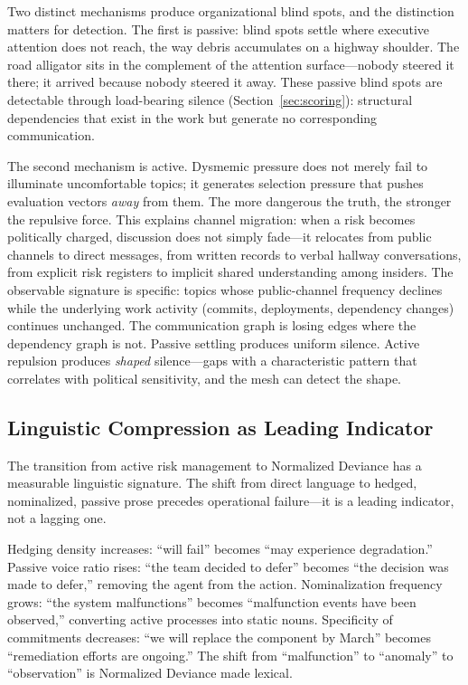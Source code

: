 \documentclass[11pt,a4paper]{article}
\begin{document}
Two distinct mechanisms produce organizational blind spots, and the distinction matters for detection. The first is passive: blind spots settle where executive attention does not reach, the way debris accumulates on a highway shoulder. The road alligator sits in the complement of the attention surface---nobody steered it there; it arrived because nobody steered it away. These passive blind spots are detectable through load-bearing silence (Section~\ref{sec:scoring}): structural dependencies that exist in the work but generate no corresponding communication.

The second mechanism is active. Dysmemic pressure does not merely fail to illuminate uncomfortable topics; it generates selection pressure that pushes evaluation vectors \emph{away} from them. The more dangerous the truth, the stronger the repulsive force. This explains channel migration: when a risk becomes politically charged, discussion does not simply fade---it relocates from public channels to direct messages, from written records to verbal hallway conversations, from explicit risk registers to implicit shared understanding among insiders. The observable signature is specific: topics whose public-channel frequency declines while the underlying work activity (commits, deployments, dependency changes) continues unchanged. The communication graph is losing edges where the dependency graph is not. Passive settling produces uniform silence. Active repulsion produces \emph{shaped} silence---gaps with a characteristic pattern that correlates with political sensitivity, and the mesh can detect the shape.


\subsection{Linguistic Compression as Leading Indicator}
\label{sec:linguistic}

The transition from active risk management to Normalized Deviance has a measurable linguistic signature. The shift from direct language to hedged, nominalized, passive prose precedes operational failure---it is a leading indicator, not a lagging one.

Hedging density increases: ``will fail'' becomes ``may experience degradation.'' Passive voice ratio rises: ``the team decided to defer'' becomes ``the decision was made to defer,'' removing the agent from the action. Nominalization frequency grows: ``the system malfunctions'' becomes ``malfunction events have been observed,'' converting active processes into static nouns. Specificity of commitments decreases: ``we will replace the component by March'' becomes ``remediation efforts are ongoing.'' The shift from ``malfunction'' to ``anomaly'' to ``observation'' is Normalized Deviance made lexical.
\end{document}
